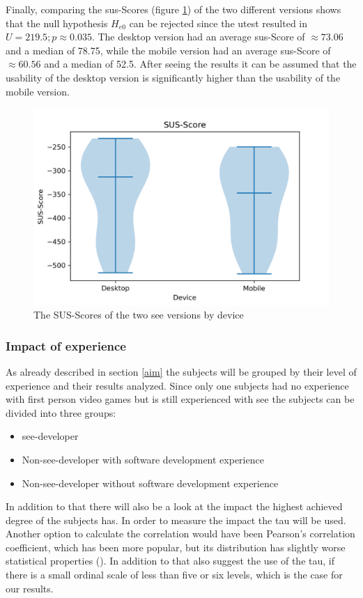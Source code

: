 Finally, comparing the \gls{sus}-Scores (figure \ref{fig:sus-vio}) of the two different versions shows that the null hypothesis $H_{e0}$ can be rejected since the \gls{utest} resulted in $U = 219.5; p \approx 0.035$.
The desktop version had an average \gls{sus}-Score of $\approx 73.06$ and a median of 78.75, while the mobile version had an average \gls{sus}-Score of $\approx 60.56$ and a median of 52.5. 
After seeing the results it can be assumed that the \gls{usability} of the desktop version is significantly higher than the \gls{usability} of the mobile version.
\begin{figure}[htb]
  \centering
  \includegraphics[width=1\textwidth]{Evaluation/img/SUS-Score_violin.png}
  \caption{The SUS-Scores of the two \gls{see} versions by device}\label{fig:sus-vio}
\end{figure}

\subsubsection{Impact of experience}
As already described in section \ref{aim} the subjects will be grouped by their level of experience and their results analyzed.
Since only one subjects had no experience with first person video games but is still experienced with \gls{see} the subjects can be divided into three groups: 
\begin{itemize}
  \item \gls{see}-developer
  \item Non-\gls{see}-developer with software development experience
  \item Non-\gls{see}-developer without software development experience
\end{itemize}
In addition to that there will also be a look at the impact the highest achieved degree of the subjects has.
In order to measure the impact the \gls{tau} will be used.
Another option to calculate the correlation would have been Pearson’s correlation coefficient, which has been more popular, but its distribution has slightly worse statistical properties (\cite{hauke2011comparison}).
In addition to that \cite{khamis2008measures} also suggest the use of the \gls{tau}, if there is a small ordinal scale of less than five or six levels, which is the case for our results.

